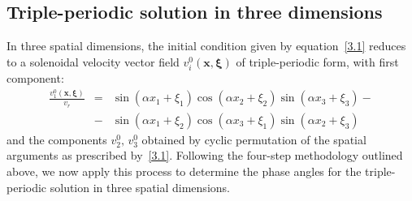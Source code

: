 \documentclass[11pt]{jfm}
\numberwithin{equation}{section}
\begin{document}
\subsection{Triple-periodic solution in three dimensions}
\label{sec:3D}
\label{subsec:3D-triple}
In three spatial dimensions, the initial condition given by equation~\eqref{3.1} reduces to a solenoidal velocity vector field $v_i^0(\boldsymbol{x}, \boldsymbol{\xi})$ of triple-periodic form, with first component:
\begin{eqnarray}
\label{4.1}
\frac{v_1^0(\boldsymbol{x}, \boldsymbol{\xi})}{v_r}& = &\sin { \left(\alpha x_1+\xi_1 \right) } \cos {\left(\alpha x_2+\xi_2\right) }\sin { \left(\alpha x_3+\xi_3\right) }- \nonumber\\
&-&\sin  {\left( \alpha x_1+\xi_2\right) } \cos  { \left(\alpha x_3+\xi_1 \right) } \sin  {\left( \alpha x_2+\xi_3\right) }
\end{eqnarray}
and the components $v_2^0,\, v_3^0$ obtained by cyclic permutation of the spatial arguments as prescribed by~\eqref{3.1}.
Following the four-step methodology outlined above, we now apply this process to determine the phase angles for the triple-periodic solution in three spatial dimensions.
\end{document}
